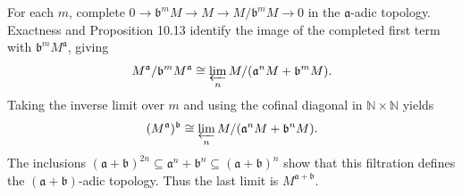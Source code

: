 For each $m$, complete $0\to\mathfrak{b}^mM\to M\to M/\mathfrak{b}^mM\to0$ in the $\mathfrak{a}$-adic topology. Exactness and Proposition 10.13 identify the image of the completed first term with $\mathfrak{b}^mM^{\mathfrak{a}}$, giving
\[M^{\mathfrak{a}}/\mathfrak{b}^mM^{\mathfrak{a}}\cong\varprojlim_n M/(\mathfrak{a}^nM+\mathfrak{b}^mM).\]
Taking the inverse limit over $m$ and using the cofinal diagonal in $\mathbb{N}\times\mathbb{N}$ yields
\[(M^{\mathfrak{a}})^{\mathfrak{b}}\cong\varprojlim_n M/(\mathfrak{a}^nM+\mathfrak{b}^nM).\]
The inclusions $(\mathfrak{a}+\mathfrak{b})^{2n}\subseteq\mathfrak{a}^n+\mathfrak{b}^n\subseteq(\mathfrak{a}+\mathfrak{b})^n$ show that this filtration defines the $(\mathfrak{a}+\mathfrak{b})$-adic topology. Thus the last limit is $M^{\mathfrak{a}+\mathfrak{b}}$.
